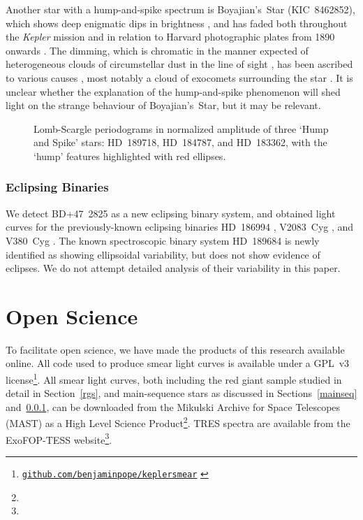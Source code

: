 \documentclass[modern]{aastex62}
\newcommand{\kepler}{\textit{Kepler}\xspace}
\begin{document}
Another star with a hump-and-spike spectrum is Boyajian's~Star (KIC~8462852), which shows deep enigmatic dips in brightness \citep{2016MNRAS.457.3988B}, and has faded both throughout the \kepler mission \citep{2016ApJ...830L..39M} and in relation to Harvard photographic plates from 1890 onwards \citep{2016ApJ...822L..34S}. The dimming, which is chromatic in the manner expected of heterogeneous clouds of circumstellar dust in the line of sight \citep{2018ApJ...853..130D,2018arXiv180608842B}, has been ascribed to various causes \citep[reviewed in][]{2018RNAAS...2a..16W}, most notably a cloud of exocomets surrounding the star \citep[e.g.][]{2018MNRAS.473.5286W}. It is unclear whether the explanation of the hump-and-spike phenomenon will shed light on the strange behaviour of Boyajian's~Star, but it may be relevant.

\begin{figure}

\caption{\label{hs_fig}
Lomb-Scargle periodograms in normalized amplitude of three `Hump and Spike' stars: HD~189718, HD~184787, and HD~183362, with the `hump' features highlighted with red ellipses.}
\end{figure}

\subsubsection{Eclipsing Binaries}
\label{ebs}

We detect BD+47~2825 as a new eclipsing binary system, and obtained light curves for the previously-known eclipsing binaries HD~186994 \citep{2016AJ....151..101A}, V2083~Cyg \citep{2012MNRAS.421.1196Z}, and V380~Cyg \citep{2003A&A...399.1115C}. The known spectroscopic binary system HD~189684 \citep{2008MNRAS.389..869E} is newly identified as showing ellipsoidal variability, but does not show evidence of eclipses. We do not attempt detailed analysis of their variability in this paper.

\section{Open Science}
\label{open}

To facilitate open science, we have made the products of this research available online. All code used to produce smear light curves is available under a GPL~v3 license\footnote{ \href{https://github.com/benjaminpope/keplersmear}{\nolinkurl{github.com/benjaminpope/keplersmear}} \citep{keplersmear_zenodo}}. All smear light curves, both including the red giant sample studied in detail in Section~\ref{rgs}, and main-sequence stars as discussed in Sections~\ref{mainseq} and~\ref{ebs}, can be downloaded from the Mikulski Archive for Space Telescopes (MAST) as a High Level Science Product\footnote{}. TRES spectra are available from the ExoFOP-TESS website\footnote{}.
\end{document}
